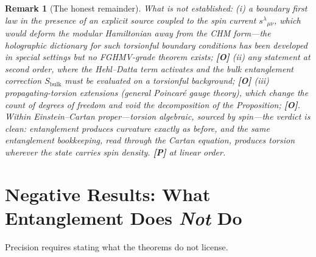 \documentclass[11pt]{article}
\newtheorem{remark}[theorem]{Remark}
\theoremstyle{definition}
\newcommand{\pP}{\textbf{[P]}}
\newcommand{\pO}{\textbf{[O]}}
\begin{document}
\begin{remark}[The honest remainder]
What is \emph{not} established: (i) a boundary first law in the presence of
an explicit source coupled to the spin current $s^\lambda{}_{\mu\nu}$,
which would deform the modular Hamiltonian away from the CHM form---the
holographic dictionary for such torsionful boundary conditions has been
developed in special settings \cite{GallegosGursoy2020} but no
FGHMV-grade theorem exists; \pO{} (ii) any statement at second order, where
the Hehl--Datta term activates and the bulk entanglement correction
$S_{\mathrm{bulk}}$ \cite{FLM2013} must be evaluated on a torsionful
background; \pO{} (iii) propagating-torsion extensions (general Poincar\'e
gauge theory), which change the count of degrees of freedom and void the
decomposition of the Proposition; \pO{}. Within
Einstein--Cartan proper---torsion algebraic, sourced by spin---the verdict
is clean: \emph{entanglement produces curvature exactly as before, and the
same entanglement bookkeeping, read through the Cartan equation, produces
torsion wherever the state carries spin density.} \pP{} at linear order.
\end{remark}

\section{Negative Results: What Entanglement Does \emph{Not} Do}

Precision requires stating what the theorems do not license.
\end{document}

